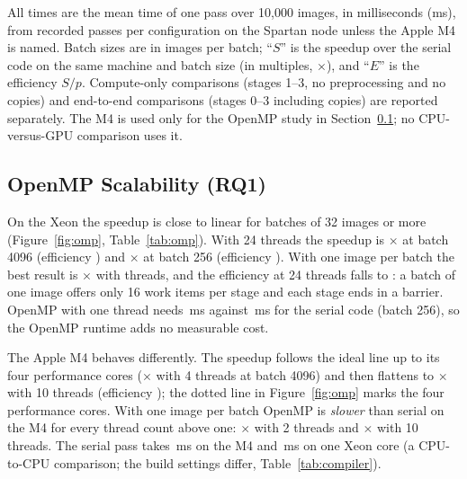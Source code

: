All times are the mean time of one pass over 10{,}000 images, in milliseconds (ms), from  recorded passes per configuration on the Spartan node unless the Apple M4 is named. Batch sizes are in images per batch; ``$S$'' is the speedup over the serial code on the same machine and batch size (in multiples, $\times$), and ``$E$'' is the efficiency $S/p$. Compute-only comparisons (stages 1--3, no preprocessing and no copies) and end-to-end comparisons (stages 0--3 including copies) are reported separately. The M4 is used only for the OpenMP study in Section~\ref{sec:omp}; no CPU-versus-GPU comparison uses it.

\subsection{OpenMP Scalability (RQ1)}\label{sec:omp}

On the Xeon the speedup is close to linear for batches of 32 images or more (Figure~\ref{fig:omp}, Table~\ref{tab:omp}). With 24 threads the speedup is $\times$ at batch 4096 (efficiency ) and $\times$ at batch 256 (efficiency ). With one image per batch the best result is $\times$ with  threads, and the efficiency at 24 threads falls to : a batch of one image offers only 16 work items per stage and each stage ends in a barrier. OpenMP with one thread needs \,ms against \,ms for the serial code (batch 256), so the OpenMP runtime adds no measurable cost.

The Apple M4 behaves differently. The speedup follows the ideal line up to its four performance cores ($\times$ with 4 threads at batch 4096) and then flattens to $\times$ with 10 threads (efficiency ); the dotted line in Figure~\ref{fig:omp} marks the four performance cores. With one image per batch OpenMP is \emph{slower} than serial on the M4 for every thread count above one: $\times$ with 2 threads and $\times$ with 10 threads. The serial pass takes \,ms on the M4 and \,ms on one Xeon core (a CPU-to-CPU comparison; the build settings differ, Table~\ref{tab:compiler}).


